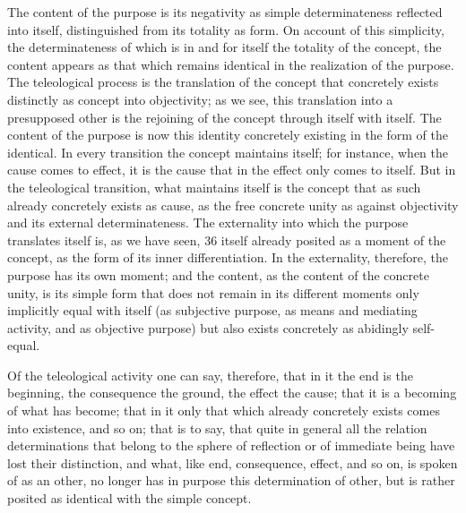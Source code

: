 The content of the purpose is its negativity as simple determinateness
reflected into itself, distinguished from its totality as form. On account of
this simplicity, the determinateness of which is in and for itself the totality
of the concept, the content appears as that which remains identical in the
realization of the purpose. The teleological process is the translation of
the concept that concretely exists distinctly as concept into objectivity;
as we see, this translation into a presupposed other is the rejoining of
the concept through itself with itself. The content of the purpose is now
this identity concretely existing in the form of the identical. In every
transition the concept maintains itself; for instance, when the cause comes
to effect, it is the cause that in the effect only comes to itself. But in
the teleological transition, what maintains itself is the concept that as
such already concretely exists as cause, as the free concrete unity as against
objectivity and its external determinateness. The externality into which
the purpose translates itself is, as we have seen, 36 itself already posited as
a moment of the concept, as the form of its inner differentiation. In the
externality, therefore, the purpose has its own moment; and the content, as
the content of the concrete unity, is its simple form that does not remain
in its different moments only implicitly equal with itself (as subjective
purpose, as means and mediating activity, and as objective purpose) but
also exists concretely as abidingly self-equal.

Of the teleological activity one can say, therefore, that in it the end
is the beginning, the consequence the ground, the effect the cause; that
it is a becoming of what has become; that in it only that which already
concretely exists comes into existence, and so on; that is to say, that quite
in general all the relation determinations that belong to the sphere of
reflection or of immediate being have lost their distinction, and what, like
end, consequence, effect, and so on, is spoken of as an other, no longer has
in purpose this determination of other, but is rather posited as identical
with the simple concept.

